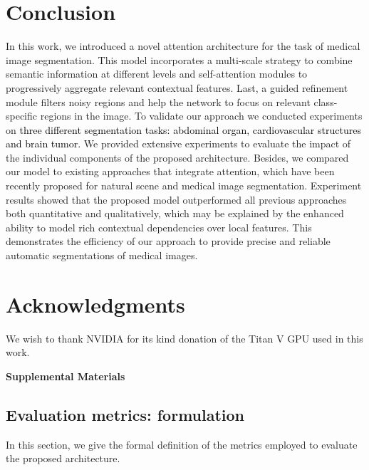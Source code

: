 \documentclass[journal]{IEEEtran}
\begin{document}
\section{Conclusion}

In this work, we introduced a novel attention architecture for the task of medical image segmentation. This model incorporates a multi-scale strategy to combine semantic information at different levels and self-attention modules to progressively aggregate relevant contextual features. Last, a guided refinement module filters noisy regions and help the network to focus on relevant class-specific regions in the image. To validate our approach we conducted experiments on \textcolor{black}{ three different segmentation tasks: abdominal organ, cardiovascular structures and brain tumor.} We provided extensive experiments to evaluate the impact of the individual components of the proposed architecture. Besides, we compared our model to existing approaches that integrate attention, which have been recently proposed for natural scene \cite{fu2018dual,li2018pyramid} and medical image \cite{ronneberger2015u,wang18d,schlemper2019attention} segmentation. Experiment results showed that the proposed model outperformed all previous approaches both quantitative and qualitatively, which may be explained by the enhanced ability to model rich contextual dependencies over local features. This demonstrates the efficiency of our approach to provide precise and reliable automatic segmentations of medical images.


\section*{Acknowledgments}

We wish to thank NVIDIA for its kind donation of the Titan V GPU used in this work.






\clearpage

\setcounter{page}{1}
\begin{center}
\textbf{\large Supplemental Materials}
\end{center}

\subsection*{\textbf{Evaluation metrics: formulation}}

In this section, we give the formal definition of the metrics employed to evaluate the proposed architecture.
\end{document}
